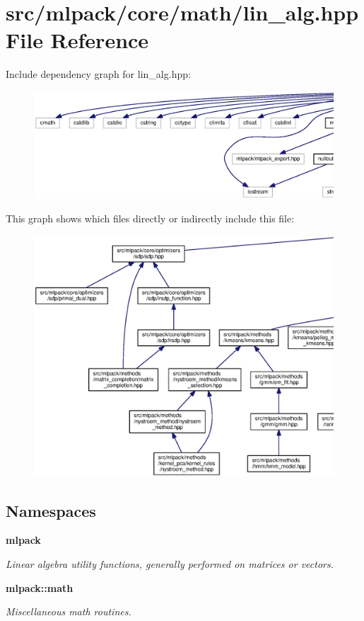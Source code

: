 \section{src/mlpack/core/math/lin\+\_\+alg.hpp File Reference}
\label{lin__alg_8hpp}
Include dependency graph for lin\+\_\+alg.\+hpp\+:
\nopagebreak
\begin{figure}[H]
\begin{center}
\leavevmode
\includegraphics[width=350pt]{lin__alg_8hpp__incl}
\end{center}
\end{figure}
This graph shows which files directly or indirectly include this file\+:
\nopagebreak
\begin{figure}[H]
\begin{center}
\leavevmode
\includegraphics[width=350pt]{lin__alg_8hpp__dep__incl}
\end{center}
\end{figure}
\subsection*{Namespaces}
\begin{DoxyCompactItemize}
\item 
 {\bf mlpack}
\begin{DoxyCompactList}\small\item\em Linear algebra utility functions, generally performed on matrices or vectors. \end{DoxyCompactList}\item 
 {\bf mlpack\+::math}
\begin{DoxyCompactList}\small\item\em Miscellaneous math routines. \end{DoxyCompactList}\end{DoxyCompactItemize}
